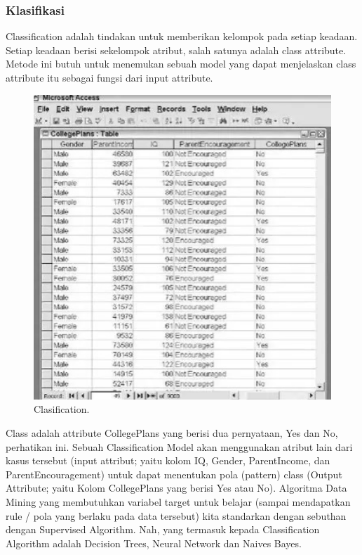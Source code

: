 \subsubsection{Klasifikasi}
\hfill\break
Classification adalah tindakan untuk memberikan kelompok pada setiap keadaan. Setiap keadaan berisi sekelompok atribut, salah satunya adalah class attribute. Metode ini butuh untuk menemukan sebuah model yang dapat menjelaskan class attribute itu sebagai fungsi dari input attribute.
\begin{figure}[H]
	\includegraphics[width=1\textwidth]{figures/1174006/chapter1/clasification.jpg}
	\centering
	\caption{Clasification.}
\end{figure}
\noindent
Class adalah attribute CollegePlans yang berisi dua pernyataan, Yes dan No, perhatikan ini.
\noindent
Sebuah Classification Model akan menggunakan atribut lain dari kasus tersebut (input attribut; yaitu kolom IQ, Gender, ParentIncome, dan ParentEncouragement) untuk dapat menentukan pola (pattern) class (Output Attribute; yaitu Kolom CollegePlans yang berisi Yes atau No).
\noindent
Algoritma Data Mining yang membutuhkan variabel target untuk belajar (sampai mendapatkan rule / pola yang berlaku pada data tersebut) kita standarkan dengan sebuthan dengan Supervised Algorithm.
\noindent
Nah, yang termasuk kepada Classification Algorithm adalah Decision Trees, Neural Network dan Naives Bayes.
